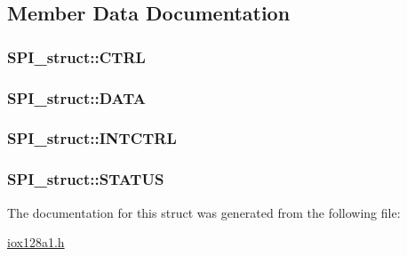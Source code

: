 \subsection{Member Data Documentation}
\hypertarget{struct_s_p_i__struct_ae3441c09ddb2d565c0dda101b4a911b0}{
\subsubsection[{CTRL}]{ {\bf SPI\_\-struct::CTRL}}}
\label{struct_s_p_i__struct_ae3441c09ddb2d565c0dda101b4a911b0}
\hypertarget{struct_s_p_i__struct_aa01a4dd46ef17788963db5551a1d63ae}{
\subsubsection[{DATA}]{ {\bf SPI\_\-struct::DATA}}}
\label{struct_s_p_i__struct_aa01a4dd46ef17788963db5551a1d63ae}
\hypertarget{struct_s_p_i__struct_a090c51ff220328d67af12ec8de56c775}{
\subsubsection[{INTCTRL}]{ {\bf SPI\_\-struct::INTCTRL}}}
\label{struct_s_p_i__struct_a090c51ff220328d67af12ec8de56c775}
\hypertarget{struct_s_p_i__struct_a9427355b9c7423dfbeadb1a5c906f86f}{
\subsubsection[{STATUS}]{ {\bf SPI\_\-struct::STATUS}}}
\label{struct_s_p_i__struct_a9427355b9c7423dfbeadb1a5c906f86f}


The documentation for this struct was generated from the following file:\begin{DoxyCompactItemize}
\item 
\hyperlink{iox128a1_8h}{iox128a1.h}\end{DoxyCompactItemize}
